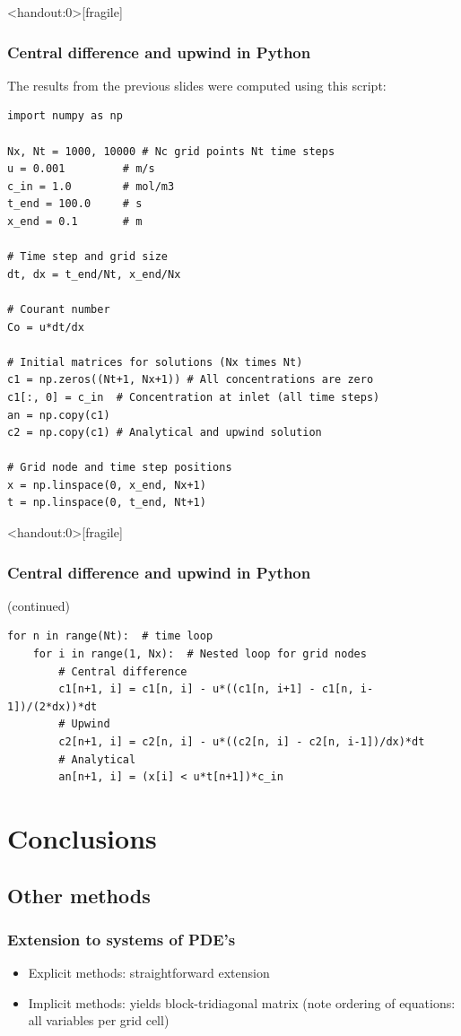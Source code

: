 \begin{frame}<handout:0>[fragile]
  \frametitle{Central difference and upwind in Python}
  \footnotesize\selectfont
  The results from the previous slides were computed using this script:
  \begin{lstlisting}
import numpy as np

Nx, Nt = 1000, 10000 # Nc grid points Nt time steps
u = 0.001         # m/s
c_in = 1.0        # mol/m3
t_end = 100.0     # s
x_end = 0.1       # m

# Time step and grid size
dt, dx = t_end/Nt, x_end/Nx

# Courant number
Co = u*dt/dx

# Initial matrices for solutions (Nx times Nt)
c1 = np.zeros((Nt+1, Nx+1)) # All concentrations are zero
c1[:, 0] = c_in  # Concentration at inlet (all time steps)
an = np.copy(c1) 
c2 = np.copy(c1) # Analytical and upwind solution

# Grid node and time step positions
x = np.linspace(0, x_end, Nx+1)
t = np.linspace(0, t_end, Nt+1)
\end{lstlisting}
\end{frame}

\begin{frame}<handout:0>[fragile]
  \frametitle{Central difference and upwind in Python}
  \footnotesize\selectfont
  (continued)
\begin{lstlisting}
for n in range(Nt):  # time loop
    for i in range(1, Nx):  # Nested loop for grid nodes
        # Central difference
        c1[n+1, i] = c1[n, i] - u*((c1[n, i+1] - c1[n, i-1])/(2*dx))*dt
        # Upwind
        c2[n+1, i] = c2[n, i] - u*((c2[n, i] - c2[n, i-1])/dx)*dt
        # Analytical
        an[n+1, i] = (x[i] < u*t[n+1])*c_in
\end{lstlisting}
\end{frame}


\section{Conclusions}
\subsection{Other methods}
\begin{frame}
  \frametitle{Extension to systems of PDE's}
  \begin{itemize}
    \item Explicit methods: straightforward extension
    \item Implicit methods: yields block-tridiagonal matrix (note ordering of equations: all variables per grid cell)
  \end{itemize}
\end{frame}

